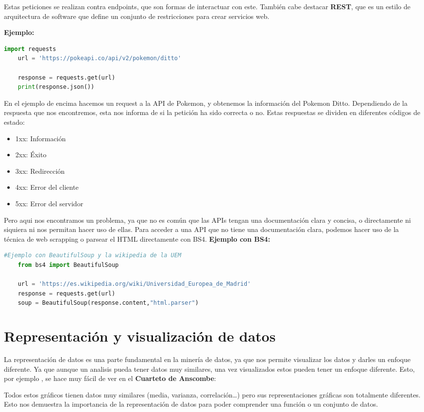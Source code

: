 Estas peticiones se realizan contra endpoints, que son formas de interactuar con este. También cabe destacar \textbf{REST}, que es un estilo de arquitectura de software que define un conjunto de restricciones para crear servicios web.

\textbf{\large Ejemplo:} 
\begin{lstlisting}[language=Python]
    import requests
    url = 'https://pokeapi.co/api/v2/pokemon/ditto'

    response = requests.get(url)
    print(response.json())
\end{lstlisting}

  En el ejemplo de encima hacemos un request a la API de Pokemon, y obtenemos la información del Pokemon Ditto. Dependiendo de la respuesta que nos encontremos, esta nos informa de si la petición ha sido correcta o no. Estas respuestas se dividen en diferentes códigos de estado:
  \begin{multicols}{2}
    \begin{itemize}
        \item 1xx: Información
        \item 2xx: Éxito
        \item 3xx: Redirección
        \item 4xx: Error del cliente
        \item 5xx: Error del servidor
    \end{itemize}
  \end{multicols}

Pero aqui nos encontramos un problema, ya que no es común que las APIs tengan una documentación clara y concisa, o directamente ni siquiera
ni nos permitan hacer uso de ellas. Para acceder a una API que no tiene una documentación clara, podemos hacer uso de la técnica de web scrapping o parsear el HTML directamente con BS4. \newline
\textbf{\large Ejemplo con BS4:} 
\begin{lstlisting}[language=Python]
    #Ejemplo con BeautifulSoup y la wikipedia de la UEM
    from bs4 import BeautifulSoup

    url = 'https://es.wikipedia.org/wiki/Universidad_Europea_de_Madrid'
    response = requests.get(url)
    soup = BeautifulSoup(response.content,"html.parser")
\end{lstlisting}

\section{\bfseries Representación y visualización de datos}
La representación de datos es una parte fundamental en la minería de datos, ya que nos permite visualizar los datos y darles un enfoque
diferente. Ya que aunque un analisis pueda tener datos muy similares, una vez visualizados estos pueden tener un enfoque diferente. Esto, por ejemplo
, se hace muy fácil de ver en el \textbf{Cuarteto de Anscombe}:


Todos estos gráficos tienen datos muy similares (media, varianza, correlación\ldots) pero sus representaciones gráficas son totalmente diferentes.
Esto nos demuestra la importancia de la representación de datos para poder comprender una función o un conjunto de datos.
